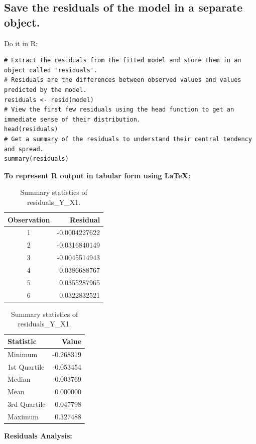 \documentclass[12pt]{article}
\begin{document}
\subsection{ Save the residuals of the model in a separate object.}
Do it in R:
\begin{lstlisting}
# Extract the residuals from the fitted model and store them in an object called 'residuals'.
# Residuals are the differences between observed values and values predicted by the model.
residuals <- resid(model)
# View the first few residuals using the head function to get an immediate sense of their distribution.
head(residuals)
# Get a summary of the residuals to understand their central tendency and spread.
summary(residuals)
\end{lstlisting}
\textbf{To represent R output in tabular form using LaTeX:}
\begin{table}[h!]
\centering
\begin{minipage}{.5\textwidth}
\centering
\begin{tabular}{|c|r|}
\hline
Observation & Residual \\
\hline
1 & -0.0004227622 \\
2 & -0.0316840149 \\
3 & -0.0045514943 \\
4 & 0.0386688767 \\
5 & 0.0355287965 \\
6 & 0.0322832521 \\
\hline
\end{tabular}
\caption{First six residuals of residuals\_Y\_X1.}
\label{tab:residuals}
\end{minipage}%
\begin{minipage}{.5\textwidth}
\centering
\begin{tabular}{|l|r|}
\hline
Statistic & Value \\
\hline
Minimum & -0.268319 \\
1st Quartile & -0.053454 \\
Median & -0.003769 \\
Mean & 0.000000 \\
3rd Quartile & 0.047798 \\
Maximum & 0.327488 \\
\hline
\end{tabular}
\caption{Summary statistics of residuals\_Y\_X1.}
\label{tab:summary_stats}
\end{minipage}
\end{table}

\textbf{Residuals Analysis:}
\end{document}
